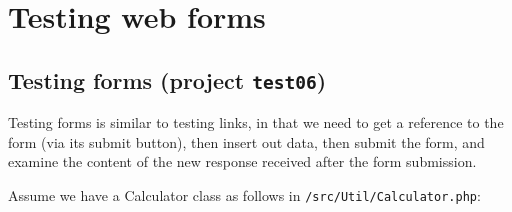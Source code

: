 \documentclass[a4paperpaper,openright]{book}
\newenvironment{Shaded}{}{}
\newcommand{\CommentTok}[1]{\textcolor[rgb]{0.38,0.63,0.69}{\textit{#1}}}
\newcommand{\KeywordTok}[1]{\textcolor[rgb]{0.00,0.44,0.13}{\textbf{#1}}}
\newcommand{\NormalTok}[1]{#1}
\newcommand{\OtherTok}[1]{\textcolor[rgb]{0.00,0.44,0.13}{#1}}
\newcommand{\StringTok}[1]{\textcolor[rgb]{0.25,0.44,0.63}{#1}}
\begin{document}
\begin{Shaded}
\end{Shaded}

\hypertarget{testing-web-forms}{%
\chapter{Testing web forms}\label{testing-web-forms}}

\hypertarget{testing-forms-project-test06}{%
\section{\texorpdfstring{Testing forms (project
\texttt{test06})}{Testing forms (project test06)}}\label{testing-forms-project-test06}}

Testing forms is similar to testing links, in that we need to get a
reference to the form (via its submit button), then insert out data,
then submit the form, and examine the content of the new response
received after the form submission.

Assume we have a Calculator class as follows in
\texttt{/src/Util/Calculator.php}:
\end{document}
